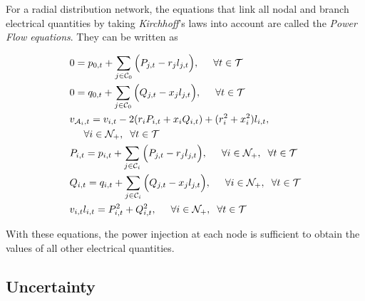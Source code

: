 For a radial distribution network, the equations that link all nodal and branch electrical quantities by taking \emph{Kirchhoff}'s laws into account are called the \emph{Power Flow equations}.
They can be written as

\begin{align}
  & 0  =  p_{0,t} + \sum_{j\in \mathcal{C}_0} \Big(P_{j,t}-r_{j}l_{j,t} \Big), \hspace{0.5cm} \forall{t} \in \mathcal{T} \label{ACOPF1}\\
  & 0   =  q_{0,t} + \sum_{j\in \mathcal{C}_0} \Big( Q_{j,t}-x_{j}l_{j,t} \Big), \hspace{0.5cm} \forall{t} \in \mathcal{T} \label{ACOPF2}\\
  & v_{\mathcal{A}_i,t}  =   v_{i,t} -2(r_iP_{i,t} + x_iQ_{i,t}) + (r_i^2 + x_i^2)l_{i,t}, \\
  & \hspace{0.5cm} \forall i \in \mathcal{N}_{+}, \hspace{0.2cm} \forall{t} \in \mathcal{T} \label{ACOPF3}\\
  & P_{i,t} =  p_{i,t} + \sum_{j\in \mathcal{C}_i} \Big( P_{j,t}-r_{j}l_{j,t} \Big), \hspace{0.5cm} \forall i \in \mathcal{N}_{+}, \hspace{0.2cm} \forall{t} \in \mathcal{T} \label{ACOPF4}\\
  & Q_{i,t}  =  q_{i,t} + \sum_{j\in \mathcal{C}_i} \Big( Q_{j,t}-x_{j}l_{j,t} \Big), \hspace{0.5cm} \forall i \in \mathcal{N}_{+}, \hspace{0.2cm} \forall{t} \in \mathcal{T} \label{ACOPF5}\\
  & v_{i,t}l_{i,t} = P_{i,t}^2 + Q_{i,t}^2, \hspace{0.5cm} \forall i \in \mathcal{N}_{+}, \hspace{0.2cm} \forall{t} \in \mathcal{T} \label{ACOPF:quad}
\end{align}

With these equations, the power injection at each node is sufficient to obtain the values of all other electrical quantities.

\subsection{Uncertainty}

